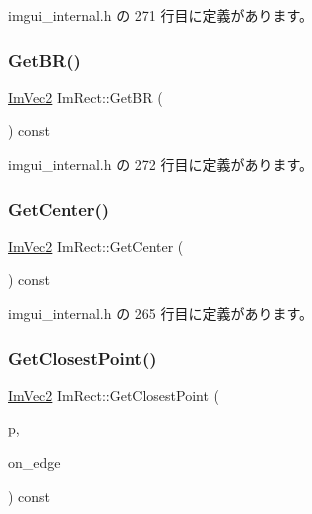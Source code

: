  imgui\+\_\+internal.\+h の 271 行目に定義があります。

\mbox{\label{struct_im_rect_ad2f2687254beed5a9b19bde0d6fa14f5}} 
\subsubsection{\texorpdfstring{Get\+B\+R()}{GetBR()}}
{\footnotesize\ttfamily \mbox{\hyperlink{struct_im_vec2}{Im\+Vec2}} Im\+Rect\+::\+Get\+BR (\begin{DoxyParamCaption}{ }\end{DoxyParamCaption}) const\hspace{0.3cm}{\ttfamily [inline]}}



 imgui\+\_\+internal.\+h の 272 行目に定義があります。

\mbox{\label{struct_im_rect_aae13f8003184fd84f29d27c3c074cf43}} 
\subsubsection{\texorpdfstring{Get\+Center()}{GetCenter()}}
{\footnotesize\ttfamily \mbox{\hyperlink{struct_im_vec2}{Im\+Vec2}} Im\+Rect\+::\+Get\+Center (\begin{DoxyParamCaption}{ }\end{DoxyParamCaption}) const\hspace{0.3cm}{\ttfamily [inline]}}



 imgui\+\_\+internal.\+h の 265 行目に定義があります。

\mbox{\label{struct_im_rect_a223c67d4c93e5c87a33a68ebb527bbb8}} 
\subsubsection{\texorpdfstring{Get\+Closest\+Point()}{GetClosestPoint()}}
{\footnotesize\ttfamily \mbox{\hyperlink{struct_im_vec2}{Im\+Vec2}} Im\+Rect\+::\+Get\+Closest\+Point (\begin{DoxyParamCaption}\item[{\mbox{\hyperlink{struct_im_vec2}{Im\+Vec2}}}]{p,  }\item[{bool}]{on\+\_\+edge }\end{DoxyParamCaption}) const\hspace{0.3cm}{\ttfamily [inline]}}



